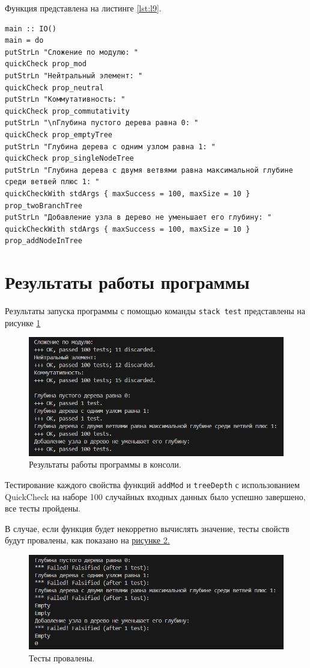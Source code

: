 \documentclass[11pt,a4paper,final]{article} %
\begin{document}
Функция представлена на листинге \ref{lst:l9}.

\begin{lstlisting}[caption={Код функции main}, label={lst:l9}]
main :: IO()
main = do 
putStrLn "Сложение по модулю: "
quickCheck prop_mod
putStrLn "Нейтральный элемент: "
quickCheck prop_neutral
putStrLn "Коммутативность: "
quickCheck prop_commutativity
putStrLn "\nГлубина пустого дерева равна 0: "
quickCheck prop_emptyTree
putStrLn "Глубина дерева с одним узлом равна 1: "
quickCheck prop_singleNodeTree 
putStrLn "Глубина дерева с двумя ветвями равна максимальной глубине среди ветвей плюс 1: "
quickCheckWith stdArgs { maxSuccess = 100, maxSize = 10 } prop_twoBranchTree
putStrLn "Добавление узла в дерево не уменьшает его глубину: "
quickCheckWith stdArgs { maxSuccess = 100, maxSize = 10 } prop_addNodeInTree
\end{lstlisting}

\newpage
\section{Результаты работы программы}
Результаты запуска программы с помощью команды \texttt{stack test} представлены на рисунке \ref{fig:res}

\begin{figure}[h]
	\centering
	\includegraphics[width=0.7\linewidth]{img/res.png}
	\caption{Результаты работы программы в консоли.}
	\label{fig:res}
\end{figure}
	
Тестирование каждого свойства функций \texttt{addMod} и \texttt{treeDepth} с использованием QuickCheck на наборе 100 случайных входных данных было успешно завершено, все тесты пройдены.

В случае, если функция будет некорретно вычислять значение, тесты свойств будут провалены, как показано на \hyperref[fig:f1]{рисунке 2.} 

\begin{figure}[h]
	\centering
	\includegraphics[width=0.75\linewidth]{img/f1.png}
	\caption{Тесты провалены.}
	\label{fig:f1}
\end{figure}
\end{document}
